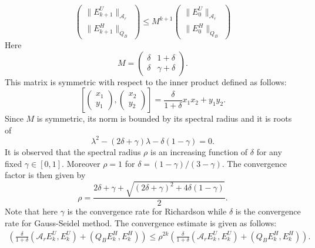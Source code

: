 \begin{itemize}
\begin{equation}
\begin{pmatrix} 
\|E^U_{k+1}\|_{\mathcal{A}_r} \\
\|E^H_{k+1}\|_{Q_B}
\end{pmatrix} \leq M^{k+1}  
\begin{pmatrix} 
\|E^U_{0}\|_{\mathcal{A}_r} \\
\|E^H_{0}\|_{Q_B}
\end{pmatrix}  
\end{equation}
Here 
\begin{equation}
M = \begin{pmatrix} 
\delta & 1 + \delta \\ \delta & \gamma + \delta 
\end{pmatrix}. 
\end{equation}
This matrix is symmetric with respect to the inner product defined as follows: 
\begin{equation}
\left [ \begin{pmatrix} x_1 \\ y_1 \end{pmatrix}, \begin{pmatrix}  x_2 \\ y_2 \end{pmatrix} \right ] = \frac{\delta}{1+\delta} x_1 x_2 + y_1 y_2. 
\end{equation} 
Since $M$ is symmetric, its norm is bounded by its spectral radius and it is roots of 
\begin{equation}
\lambda^2 - (2\delta + \gamma)\lambda - \delta (1 - \gamma) = 0. 
\end{equation} 
It is observed that the spectral radius $\rho$ is an increasing function of $\delta$ for any fixed $\gamma \in [0,1]$. Moreover $\rho = 1$ for $\delta = (1-\gamma)/(3-\gamma)$. The convergence factor is then given by 
\begin{equation}
\rho = \frac{2\delta + \gamma + \sqrt{ (2\delta + \gamma)^2 + 4\delta(1-\gamma)}}{2}. 
\end{equation} 
Note that here $\gamma$ is the convergence rate for Richardson while $\delta$ is the convergence rate for Gauss-Seidel method. The convergence estimate is given as follows: 
\begin{eqnarray*}
\left ( \frac{\delta}{1 + \delta} (\mathcal{A}_r E_k^U, E_k^U) + (Q_B E_k^H, E_k^H) \right ) \leq \rho^{2k} \left ( \frac{\delta}{1 + \delta} (\mathcal{A}_r E_k^U, E_k^U) + (Q_B E_k^H, E_k^H) \right ). 
\end{eqnarray*}


\end{itemize}

